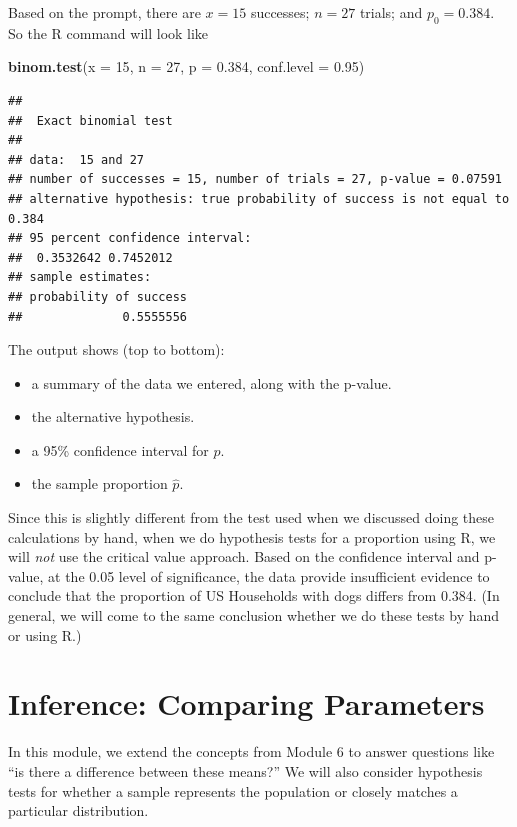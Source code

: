 \documentclass[
]{book}
\newenvironment{Shaded}{\begin{snugshade}}{\end{snugshade}}
\newcommand{\AttributeTok}[1]{\textcolor[rgb]{0.13,0.29,0.53}{#1}}
\newcommand{\DecValTok}[1]{\textcolor[rgb]{0.00,0.00,0.81}{#1}}
\newcommand{\FloatTok}[1]{\textcolor[rgb]{0.00,0.00,0.81}{#1}}
\newcommand{\FunctionTok}[1]{\textcolor[rgb]{0.13,0.29,0.53}{\textbf{#1}}}
\newcommand{\NormalTok}[1]{#1}
\providecommand{\tightlist}{%
  \setlength{\itemsep}{0pt}\setlength{\parskip}{0pt}}
\begin{document}
Based on the prompt, there are \(x = 15\) successes; \(n=27\) trials; and \(p_0=0.384\). So the R command will look like

\begin{Shaded}
\begin{Highlighting}[]
\FunctionTok{binom.test}\NormalTok{(}\AttributeTok{x =} \DecValTok{15}\NormalTok{, }\AttributeTok{n =} \DecValTok{27}\NormalTok{, }\AttributeTok{p =} \FloatTok{0.384}\NormalTok{, }\AttributeTok{conf.level =} \FloatTok{0.95}\NormalTok{)}
\end{Highlighting}
\end{Shaded}

\begin{verbatim}
## 
##  Exact binomial test
## 
## data:  15 and 27
## number of successes = 15, number of trials = 27, p-value = 0.07591
## alternative hypothesis: true probability of success is not equal to 0.384
## 95 percent confidence interval:
##  0.3532642 0.7452012
## sample estimates:
## probability of success 
##              0.5555556
\end{verbatim}

The output shows (top to bottom):

\begin{itemize}
\tightlist
\item
  a summary of the data we entered, along with the p-value.
\item
  the alternative hypothesis.
\item
  a 95\% confidence interval for \(p\).
\item
  the sample proportion \(\hat{p}\).
\end{itemize}

Since this is slightly different from the test used when we discussed doing these calculations by hand, when we do hypothesis tests for a proportion using R, we will \emph{not} use the critical value approach. Based on the confidence interval and p-value, at the 0.05 level of significance, the data provide insufficient evidence to conclude that the proportion of US Households with dogs differs from 0.384. (In general, we will come to the same conclusion whether we do these tests by hand or using R.)

\chapter{Inference: Comparing Parameters}\label{inference-comparing-parameters}

In this module, we extend the concepts from Module 6 to answer questions like ``is there a difference between these means?'' We will also consider hypothesis tests for whether a sample represents the population or closely matches a particular distribution.
\end{document}
